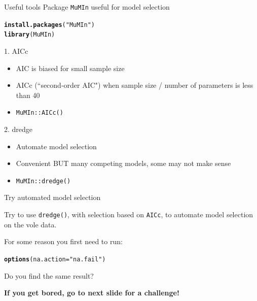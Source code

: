 \documentclass[10pt]{beamer}\usepackage[]{graphicx}\usepackage[]{color}
\makeatletter
\newcommand{\hlstr}[1]{\textcolor[rgb]{0.192,0.494,0.8}{#1}}%
\newcommand{\hlstd}[1]{\textcolor[rgb]{0.345,0.345,0.345}{#1}}%
\newcommand{\hlkwc}[1]{\textcolor[rgb]{0.333,0.667,0.333}{#1}}%
\newcommand{\hlkwd}[1]{\textcolor[rgb]{0.737,0.353,0.396}{\textbf{#1}}}%
\newenvironment{kframe}{%
 \def\at@end@of@kframe{}%
 \ifinner\ifhmode%
  \def\at@end@of@kframe{\end{minipage}}%
  \begin{minipage}{\columnwidth}%
 \fi\fi%
 \def\FrameCommand##1{\hskip\@totalleftmargin \hskip-\fboxsep
 \colorbox{shadecolor}{##1}\hskip-\fboxsep
     \hskip-\linewidth \hskip-\@totalleftmargin \hskip\columnwidth}%
 \MakeFramed {\advance\hsize-\width
   \@totalleftmargin\z@ \linewidth\hsize
   \@setminipage}}%
 {\par\unskip\endMakeFramed%
 \at@end@of@kframe}
\newenvironment{knitrout}{}{} %
\makeatother
\begin{document}
\begin{frame}{Useful tools}
Package \texttt{MuMIn} useful for model selection

\begin{knitrout}\small
{}\color{fgcolor}\begin{kframe}
\begin{alltt}
\hlkwd{install.packages}\hlstd{(}\hlstr{"MuMIn"}\hlstd{)}
\hlkwd{library}\hlstd{(MuMIn)}
\end{alltt}
\end{kframe}
\end{knitrout}

\pause

\begin{exampleblock}{1. AICc}
  \begin{itemize}
    \item AIC is biased for small sample size
    \item AICc (``second-order AIC") when sample size / number of parameters is less than 40
    \item \texttt{MuMIn::AICc()}
  \end{itemize}
\end{exampleblock}

\pause

\begin{alertblock}{2. dredge}
  \begin{itemize}
    \item Automate model selection
    \item Convenient BUT many competing models, some may not make sense
    \item \texttt{MuMIn::dredge()}
  \end{itemize}
\end{alertblock}

\end{frame}

\begin{frame}{Try automated model selection}

Try to use \texttt{dredge()}, with selection based on \texttt{AICc}, to automate model selection on the vole data. 

For some reason you first need to run:
\begin{knitrout}\small
{}\color{fgcolor}\begin{kframe}
\begin{alltt}
\hlkwd{options}\hlstd{(}\hlkwc{na.action}\hlstd{=}\hlstr{"na.fail"}\hlstd{)}
\end{alltt}
\end{kframe}
\end{knitrout}


Do you find the same result?


\vfill

\textbf{If you get bored, go to next slide for a challenge!}
\end{frame}
\end{document}
